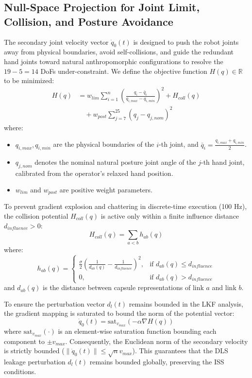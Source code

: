 \documentclass[letterpaper,journal]{IEEEtran}
\begin{document}
\subsection{Null-Space Projection for Joint Limit, Collision, and Posture Avoidance}
The secondary joint velocity vector $\dot{q}_0(t)$ is designed to push the robot joints away from physical boundaries, avoid self-collisions, and guide the redundant hand joints toward natural anthropomorphic configurations to resolve the $19 - 5 = 14$ DoFs under-constraint. We define the objective function $H(q) \in \mathbb{R}$ to be minimized:
\begin{equation}
\begin{split}
H(q) &= w_{lim} \sum_{i=1}^{n} \left( \frac{q_i - \bar{q}_i}{q_{i,max} - q_{i,min}} \right)^2 + H_{coll}(q) \\
&\quad + w_{post} \sum_{j=7}^{25} \left( q_j - q_{j,nom} \right)^2
\end{split}
\end{equation}
where:
\begin{itemize}
\item $q_{i,max}, q_{i,min}$ are the physical boundaries of the $i$-th joint, and $\bar{q}_i = \frac{q_{i,max} + q_{i,min}}{2}$.
\item $q_{j,nom}$ denotes the nominal natural posture joint angle of the $j$-th hand joint, calibrated from the operator's relaxed hand position.
\item $w_{lim}$ and $w_{post}$ are positive weight parameters.
\end{itemize}

To prevent gradient explosion and chattering in discrete-time execution (100 Hz), the collision potential $H_{coll}(q)$ is active only within a finite influence distance $d_{influence} > 0$:
\begin{equation}
H_{coll}(q) = \sum_{a < b} h_{ab}(q)
\end{equation}
where:
\begin{equation*}
h_{ab}(q) = \begin{cases}
\frac{\sigma}{2} \left( \frac{1}{d_{ab}(q)} - \frac{1}{d_{influence}} \right)^2, & \text{if } d_{ab}(q) \le d_{influence} \\
0, & \text{if } d_{ab}(q) > d_{influence}
\end{cases}
\end{equation*}
and $d_{ab}(q)$ is the distance between capsule representations of link $a$ and link $b$.

To ensure the perturbation vector $d_l(t)$ remains bounded in the LKF analysis, the gradient mapping is saturated to bound the norm of the potential vector:
\begin{equation}
\dot{q}_0(t) = \text{sat}_{v_{max}} \left( -\alpha \nabla H(q) \right)
\end{equation}
where $\text{sat}_{v_{max}}(\cdot)$ is an element-wise saturation function bounding each component to $\pm v_{max}$. Consequently, the Euclidean norm of the secondary velocity is strictly bounded ($\| \dot{q}_0(t) \| \le \sqrt{n} v_{max}$). This guarantees that the DLS leakage perturbation $d_l(t)$ remains bounded globally, preserving the ISS conditions.
\end{document}
